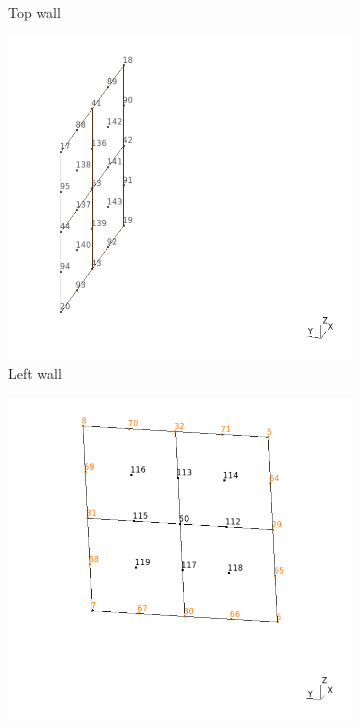 \documentclass[a4]{article}
\begin{document}
\begin{figure}
\begin{subfigure}[b]{0.48\textwidth}
    \caption{Top wall}
    \label{fig:g3}
  \end{subfigure}
  \begin{subfigure}[b]{0.48\textwidth}
    \centering
    \includegraphics[width=\textwidth]{mesh_3.png}
    \caption{Left wall}
    \label{fig:g5}
  \end{subfigure}
  \hfill
  \begin{subfigure}[b]{0.48\textwidth}
    \centering
    \includegraphics[width=\textwidth]{mesh_5.png}

\end{subfigure}
\end{figure}
\end{document}

